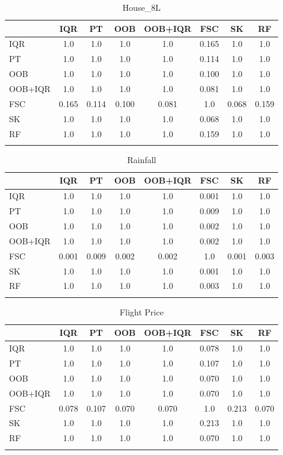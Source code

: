 \begin{longtable}{lccccccc}
\toprule
   & IQR     & PT     & OOB     & OOB+IQR     & FSC      & SK     & RF     \\
\midrule
IQR  & 1.0   & 1.0   & 1.0   & 1.0   & 0.165  & 1.0   & 1.0    \\
PT  & 1.0   & 1.0   & 1.0   & 1.0   & 0.114  & 1.0   & 1.0    \\
OOB  & 1.0   & 1.0   & 1.0   & 1.0   & 0.100  & 1.0   & 1.0    \\
OOB+IQR  & 1.0   & 1.0   & 1.0   & 1.0   & 0.081  & 1.0   & 1.0    \\
FSC  & 0.165 & 0.114 & 0.100 & 0.081 & 1.0    & 0.068 & 0.159  \\
SK  & 1.0   & 1.0   & 1.0   & 1.0   & 0.068  & 1.0   & 1.0    \\
RF  & 1.0   & 1.0   & 1.0   & 1.0   & 0.159  & 1.0   & 1.0    \\
\bottomrule
\caption{House\_8L}
\end{longtable}
\label{tab3}

\begin{longtable}{lccccccc}
\toprule
   & IQR     & PT     & OOB     & OOB+IQR     & FSC      & SK     & RF     \\
\midrule
IQR  & 1.0   & 1.0   & 1.0   & 1.0   & 0.001  & 1.0   & 1.0    \\
PT  & 1.0   & 1.0   & 1.0   & 1.0   & 0.009  & 1.0   & 1.0    \\
OOB  & 1.0   & 1.0   & 1.0   & 1.0   & 0.002  & 1.0   & 1.0    \\
OOB+IQR  & 1.0   & 1.0   & 1.0   & 1.0   & 0.002  & 1.0   & 1.0    \\
FSC  & 0.001 & 0.009 & 0.002 & 0.002 & 1.0    & 0.001 & 0.003  \\
SK  & 1.0   & 1.0   & 1.0   & 1.0   & 0.001  & 1.0   & 1.0    \\
RF  & 1.0   & 1.0   & 1.0   & 1.0   & 0.003  & 1.0   & 1.0    \\
\bottomrule
\caption{Rainfall}
\end{longtable}
\label{tab4}

\begin{longtable}{lccccccc}
\toprule
   & IQR     & PT     & OOB     & OOB+IQR     & FSC      & SK     & RF     \\
\midrule
IQR  & 1.0   & 1.0   & 1.0   & 1.0   & 0.078  & 1.0   & 1.0    \\
PT  & 1.0   & 1.0   & 1.0   & 1.0   & 0.107  & 1.0   & 1.0    \\
OOB  & 1.0   & 1.0   & 1.0   & 1.0   & 0.070  & 1.0   & 1.0    \\
OOB+IQR  & 1.0   & 1.0   & 1.0   & 1.0   & 0.070  & 1.0   & 1.0    \\
FSC  & 0.078 & 0.107 & 0.070 & 0.070 & 1.0    & 0.213 & 0.070  \\
SK  & 1.0   & 1.0   & 1.0   & 1.0   & 0.213  & 1.0   & 1.0    \\
RF  & 1.0   & 1.0   & 1.0   & 1.0   & 0.070  & 1.0   & 1.0    \\
\bottomrule
\caption{Flight Price}
\end{longtable}
\label{tab5}

